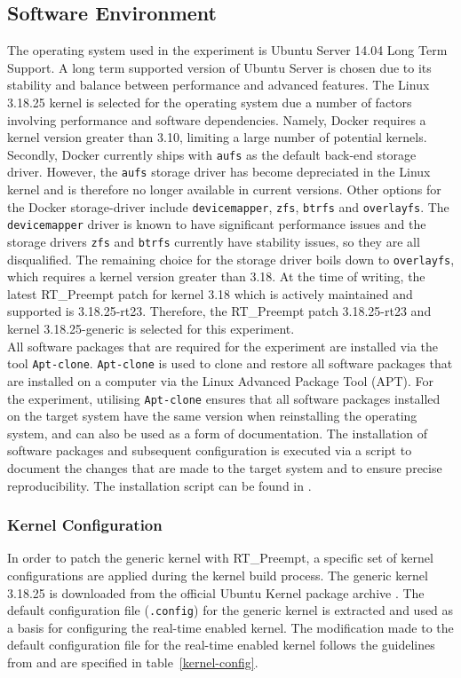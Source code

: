 \subsection{Software Environment} \label{soft-env}
The operating system used in the experiment is Ubuntu Server 14.04 Long Term Support. A long term supported version of Ubuntu Server is chosen due to its stability and balance between performance and advanced features. The Linux 3.18.25 kernel is selected for the operating system due a number of factors involving performance and software dependencies. Namely, Docker requires a kernel version greater than 3.10, limiting a large number of potential kernels. Secondly, Docker currently ships with \texttt{aufs} as the default back-end storage driver. However, the \texttt{aufs} storage driver has become depreciated in the Linux kernel and is therefore no longer available in current versions. Other options for the Docker storage-driver include \texttt{devicemapper}, \texttt{zfs}, \texttt{btrfs} and \texttt{overlayfs}. The \texttt{devicemapper} driver is known to have significant performance issues and the storage drivers \texttt{zfs} and \texttt{btrfs} currently have stability issues, so they are all disqualified. The remaining choice for the storage driver boils down to \texttt{overlayfs}, which requires a kernel version greater than 3.18. At the time of writing, the latest RT\_Preempt patch for kernel 3.18 which is actively maintained and supported is 3.18.25-rt23. Therefore, the RT\_Preempt patch 3.18.25-rt23 and kernel 3.18.25-generic is selected for this experiment. \\

All software packages that are required for the experiment are installed via the tool \texttt{Apt-clone}. \texttt{Apt-clone} is used to clone and restore all software packages that are installed on a computer via the Linux Advanced Package Tool (APT). For the experiment, utilising \texttt{Apt-clone} ensures that all software packages installed on the target system have the same version when reinstalling the operating system, and can also be used as a form of documentation. The installation of software packages and subsequent configuration is executed via a script to document the changes that are made to the target system and to ensure precise reproducibility. The installation script can be found in \cite{to-come}. 


\subsubsection{Kernel Configuration} 
In order to patch the generic kernel with RT\_Preempt, a specific set of kernel configurations are applied during the kernel build process. The generic kernel 3.18.25 is downloaded from the official Ubuntu Kernel package archive \cite{kernel}. The default configuration file (\texttt{.config}) for the generic kernel is extracted and used as a basis for configuring the real-time enabled kernel. The modification made to the default configuration file for the real-time enabled kernel follows the guidelines from \cite{rt-howto} and are specified in table~\ref{kernel-config}.  

